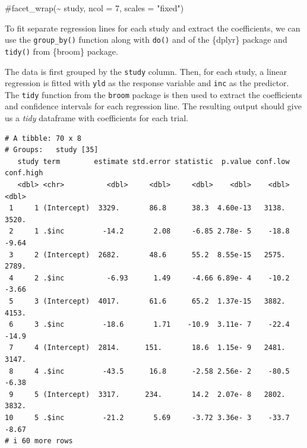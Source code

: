 \documentclass[
  letterpaper,
]{book}
\newenvironment{Shaded}{\begin{snugshade}}{\end{snugshade}}
\newcommand{\AttributeTok}[1]{\textcolor[rgb]{0.40,0.45,0.13}{#1}}
\newcommand{\CommentTok}[1]{\textcolor[rgb]{0.37,0.37,0.37}{#1}}
\newcommand{\ConstantTok}[1]{\textcolor[rgb]{0.56,0.35,0.01}{#1}}
\newcommand{\FunctionTok}[1]{\textcolor[rgb]{0.28,0.35,0.67}{#1}}
\newcommand{\NormalTok}[1]{\textcolor[rgb]{0.00,0.23,0.31}{#1}}
\newcommand{\OtherTok}[1]{\textcolor[rgb]{0.00,0.23,0.31}{#1}}
\newcommand{\SpecialCharTok}[1]{\textcolor[rgb]{0.37,0.37,0.37}{#1}}
\begin{document}
\begin{Shaded}
\begin{Highlighting}[]
      \CommentTok{\#facet\_wrap(\textasciitilde{} study, ncol = 7, scales = "fixed") }
\end{Highlighting}
\end{Shaded}

To fit separate regression lines for each study and extract the
coefficients, we can use the \texttt{group\_by()} function along with
\texttt{do()} and of the \{dplyr\} package and \texttt{tidy()} from
\{broom\} package.

The data is first grouped by the \texttt{study} column. Then, for each
study, a linear regression is fitted with \texttt{yld} as the response
variable and \texttt{inc} as the predictor. The \texttt{tidy} function
from the \texttt{broom} package is then used to extract the coefficients
and confidence intervals for each regression line. The resulting output
should give us a \emph{tidy} dataframe with coefficients for each trial.

\begin{Shaded}
\end{Shaded}

\begin{verbatim}
# A tibble: 70 x 8
# Groups:   study [35]
   study term        estimate std.error statistic  p.value conf.low conf.high
   <dbl> <chr>          <dbl>     <dbl>     <dbl>    <dbl>    <dbl>     <dbl>
 1     1 (Intercept)  3329.       86.8      38.3  4.60e-13   3138.    3520.  
 2     1 .$inc         -14.2       2.08     -6.85 2.78e- 5    -18.8     -9.64
 3     2 (Intercept)  2682.       48.6      55.2  8.55e-15   2575.    2789.  
 4     2 .$inc          -6.93      1.49     -4.66 6.89e- 4    -10.2     -3.66
 5     3 (Intercept)  4017.       61.6      65.2  1.37e-15   3882.    4153.  
 6     3 .$inc         -18.6       1.71    -10.9  3.11e- 7    -22.4    -14.9 
 7     4 (Intercept)  2814.      151.       18.6  1.15e- 9   2481.    3147.  
 8     4 .$inc         -43.5      16.8      -2.58 2.56e- 2    -80.5     -6.38
 9     5 (Intercept)  3317.      234.       14.2  2.07e- 8   2802.    3832.  
10     5 .$inc         -21.2       5.69     -3.72 3.36e- 3    -33.7     -8.67
# i 60 more rows
\end{verbatim}
\end{document}
